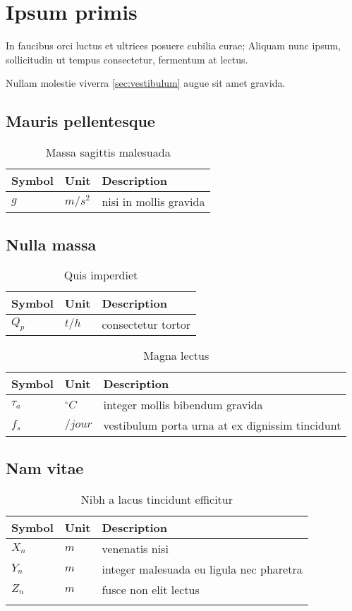 \section{Ipsum primis}

In faucibus orci luctus et ultrices posuere cubilia curae; Aliquam nunc ipsum,
sollicitudin ut tempus consectetur, fermentum at lectus.

Nullam molestie viverra \ref{sec:vestibulum} augue sit amet gravida.

\newenvironment{nomenclature}[1]
{
\begin{table}[hbt]
\caption{#1}
\begin{center}
\begin{tabular}{|l|l|l|}
\hline
\textbf{Symbol} & \textbf{Unit} & \textbf{Description}\\
\hline
}
{
\\\hline
\end{tabular}
\end{center}
\end{table}
}

\subsection{Mauris pellentesque}

\begin{nomenclature}{Massa sagittis malesuada}
$g$     & $m/s^{2}$ & nisi in mollis gravida
\end{nomenclature}

\subsection{Nulla massa}

\begin{nomenclature}{Quis imperdiet}
$Q_{p}$         & $t/h$             & consectetur tortor
\end{nomenclature}

\begin{nomenclature}{Magna lectus}
$\tau_{a}$    	& $^{\circ}C$       & integer mollis bibendum gravida\\
$f_{s}$     	& $/jour$           & vestibulum porta urna at ex dignissim tincidunt
\end{nomenclature}

\subsection{Nam vitae}

\begin{nomenclature}{Nibh a lacus tincidunt efficitur}
$X_n$   & $m$               & venenatis nisi\\
$Y_n$   & $m$               & integer malesuada eu ligula nec pharetra\\
$Z_n$   & $m$               & fusce non elit lectus\\
\end{nomenclature}

